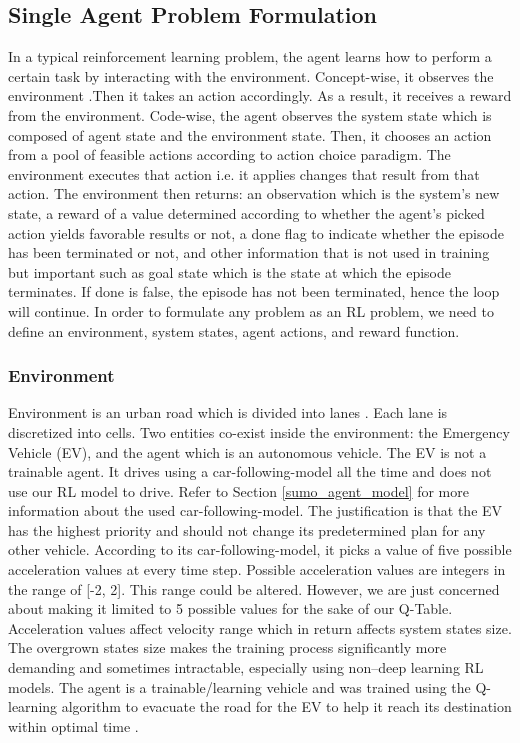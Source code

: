 \subsection{Single Agent Problem Formulation}
\label{method_single_agent_pf}
In a typical reinforcement learning problem, the agent learns how to perform a certain task by interacting with the environment.  Concept-wise, it observes the environment .Then it takes an action accordingly. As a result, it receives a reward from the environment. Code-wise, the agent observes the system state which is composed of agent state and the environment state. Then, it chooses an action from a pool of feasible actions according to action choice paradigm. The environment executes that action i.e. it applies changes that result from that action. The environment then returns: an observation which is the system's new state, a reward of a value determined according to whether the agent’s picked action yields favorable results or not, a done flag to indicate whether the episode has been terminated or not, and other information that is not used in training but important such as goal state which is the state at which the episode terminates. If done is false, the episode has not been terminated, hence the loop will continue. In order to formulate any problem as an RL problem, we need to define an environment, system states, agent actions, and reward function. 


\subsubsection{Environment}
\label{sumo_env_SA}
Environment is an urban road which is divided into lanes . Each lane is discretized into cells. Two entities co-exist inside the environment: the Emergency Vehicle (EV), and the agent which is an autonomous vehicle. The EV is not a trainable agent. It drives using a car-following-model all the time and does not use our RL model to drive.  Refer to Section \ref{sumo_agent_model} for more information about the used car-following-model. The justification is that the EV has the highest priority and should not change its predetermined plan for any other vehicle. According to its car-following-model, it picks a value of five possible acceleration values at every time step. Possible acceleration values are integers in the range of [-2, 2]. This range could be altered. However, we are just concerned about making it limited to 5 possible values for the sake of our Q-Table. Acceleration values affect velocity range which in return affects system states size. The overgrown states size makes the training process significantly more demanding and sometimes intractable, especially using non–deep learning RL models. The agent is a trainable/learning vehicle and was trained using the Q-learning algorithm to evacuate the road for the EV to help it reach its destination within optimal time .\\

